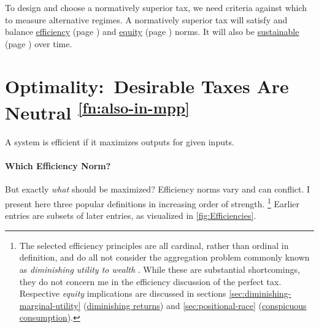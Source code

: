 



To design and choose a normatively superior tax, we need criteria against which to measure alternative regimes.
A normatively superior tax will satisfy and balance \hyperref[sec:tax-optimality]{efficiency} (page \pageref{sec:tax-optimality}) and \hyperref[sec:tax-justice]{equity} (page \pageref{sec:tax-justice}) norms.
It will also be \hyperref[sec:tax-sustainability]{sustainable} (page \pageref{sec:tax-sustainability}) over time.

\section[Optimality]{Optimality:~Desirable Taxes Are Neutral \textsuperscript{\ref{fn:also-in-mpp}}}
	\label{sec:tax-optimality}
A system is efficient if it maximizes outputs for given inputs.


\paragraph{Which Efficiency Norm?}
But exactly \emph{what} should be maximized?
Efficiency norms vary and can conflict.
I present here three popular definitions in increasing order of strength.
\footnote{
	The selected efficiency principles are all cardinal, rather than ordinal in definition, and do all not consider the aggregation problem commonly known as \emph{diminishing utility to wealth} \citep{Hicks1946}.
	While these are substantial shortcomings, they do not concern me in the efficiency discussion of the perfect tax.
	Respective \emph{equity} implications are discussed in sections \ref{sec:diminishing-marginal-utility} (\hyperref[sec:diminishing-marginal-utility]{diminishing returns}) and \ref{sec:positional-race} (\hyperref[sec:positional-race]{conspicuous consumption}).
}
Earlier entries are subsets of later entries, as visualized in \autoref{fig:Efficiencies}.

